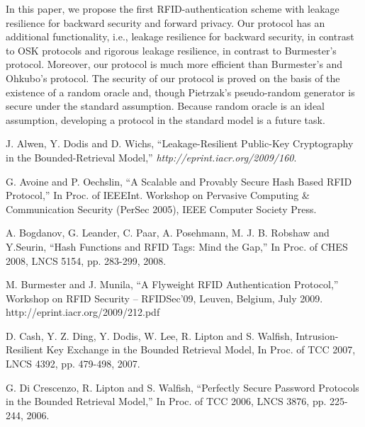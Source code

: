 \documentclass[english]{llncs}
\begin{document}
In this paper, we propose the first RFID-authentication scheme with
leakage resilience for backward security and forward privacy. Our
protocol has an additional functionality, i.e., leakage resilience
for backward security, in contrast to OSK protocols and rigorous leakage
resilience, in contrast to Burmester's protocol. Moreover, our protocol
is much more efficient than Burmester's and Ohkubo's protocol. The security of
our protocol is proved on the basis of the existence of a random oracle
and, though Pietrzak's pseudo-random generator
is secure under the standard assumption. Because random oracle 
is an ideal assumption, developing
a protocol in the standard model is a future task.
\begin{thebibliography}{21}
 J. Alwen, Y. Dodis and D. Wichs, {}``Leakage-Resilient
Public-Key Cryptography in the Bounded-Retrieval Model,'' \textit{http://eprint.iacr.org/2009/160}.

 G. Avoine and P. Oechslin, {}``A Scalable and Provably
Secure Hash Based RFID Protocol,'' In Proc. of IEEEInt. Workshop
on Pervasive Computing \& Communication Security (PerSec 2005), IEEE
Computer Society Press.

 A. Bogdanov, G. Leander, C. Paar, A. Posehmann,
M. J. B. Robshaw and Y.Seurin, {}``Hash Functions and RFID Tags:
Mind the Gap,'' In Proc. of CHES 2008, LNCS 5154, pp. 283-299, 2008.

 M. Burmester and J. Munila, {}``A Flyweight RFID
Authentication Protocol,'' Workshop on RFID Security -- RFIDSec'09,
Leuven, Belgium, July 2009. http://eprint.iacr.org/2009/212.pdf

D. Cash, Y. Z. Ding, Y. Dodis, W. Lee, R. Lipton
and S. Walfish, \textquotedbl{}Intrusion-Resilient Key Exchange in
the Bounded Retrieval Model,\textquotedbl{} In Proc. of TCC 2007,
LNCS 4392, pp. 479-498, 2007.




 G. Di Crescenzo, R. Lipton and S. Walfish, {}``Perfectly
Secure Password Protocols in the Bounded Retrieval Model,'' In Proc.
of TCC 2006, LNCS 3876, pp. 225-244, 2006.





\end{thebibliography}
\end{document}
